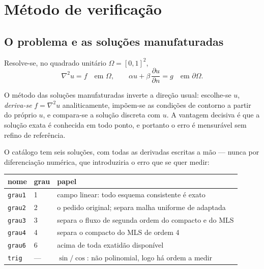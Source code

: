 \section{Método de verificação}
\label{sec:metodo}


\subsection{O problema e as soluções manufaturadas}

Resolve-se, no quadrado unitário $\Omega=[0,1]^2$,
\begin{equation}
  \nabla^2 u = f \quad\text{em } \Omega,
  \qquad
  \alpha u + \beta\,\frac{\partial u}{\partial n} = g \quad\text{em } \partial\Omega .
  \label{eq:poisson}
\end{equation}

O método das soluções manufaturadas inverte a direção usual: escolhe-se $u$,
\emph{deriva-se} $f=\nabla^2 u$ analiticamente, impõem-se as condições de
contorno a partir do próprio $u$, e compara-se a solução discreta com $u$. A
vantagem decisiva é que a solução exata é conhecida em todo ponto, e portanto o
erro é mensurável sem refino de referência.

O catálogo tem seis soluções, com todas as derivadas escritas a mão --- nunca por
diferenciação numérica, que introduziria o erro que se quer medir:

\begin{center}
\begin{tabular}{lll}
\toprule
nome & grau & papel \\
\midrule
\texttt{grau1} & 1 & campo linear: todo esquema consistente é exato \\
\texttt{grau2} & 2 & o pedido original; separa malha uniforme de adaptada \\
\texttt{grau3} & 3 & separa o fluxo de segunda ordem do compacto e do MLS \\
\texttt{grau4} & 4 & separa o compacto do MLS de ordem 4 \\
\texttt{grau6} & 6 & acima de toda exatidão disponível \\
\texttt{trig}  & --- & $\sin/\cos$: não polinomial, logo há ordem a medir \\
\bottomrule
\end{tabular}
\end{center}

